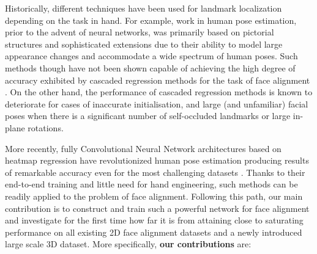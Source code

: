 	Historically, different techniques have been used for landmark localization depending on the task in hand. For example, work in human pose estimation, prior to the advent of neural networks, was primarily based on pictorial structures \cite{felzenszwalb2005pictorial} and sophisticated extensions \cite{yang2011articulated, pishchulin2013poselet, tian2012exploring, sapp2013modec, pishchulin2013strong} due to their ability to model large appearance changes and accommodate a wide spectrum of human poses. Such methods though have not been shown capable of achieving the high degree of accuracy exhibited by cascaded regression methods for the task of face alignment \cite{dollar2010cascaded, Cao2012shaperegression,xiong2013supervised,zhu2016face,tzimiropoulos2015project}. On the other hand, the performance of cascaded regression methods is known to deteriorate for cases of inaccurate initialisation, and large (and unfamiliar) facial poses when there is a significant number of self-occluded landmarks or large in-plane rotations. 

	More recently, fully Convolutional Neural Network architectures based on heatmap regression have revolutionized human pose estimation \cite{toshev2014deeppose, tompson2014joint, pfister2015flowing, insafutdinov2016deepercut, pishchulin2016deepcut, wei2016convolutional, newell2016stacked, bulat2016human} producing results of remarkable accuracy even for the most challenging  datasets \cite{andriluka20142d}. Thanks to their end-to-end training and little need for hand engineering, such methods can be readily applied to the problem of face alignment. Following this path, our main contribution is to construct and train such a powerful network for face alignment and investigate for the first time how far it is from attaining close to saturating performance on all existing 2D face alignment datasets and a newly introduced large scale 3D dataset. More specifically, \textbf{our contributions} are:

